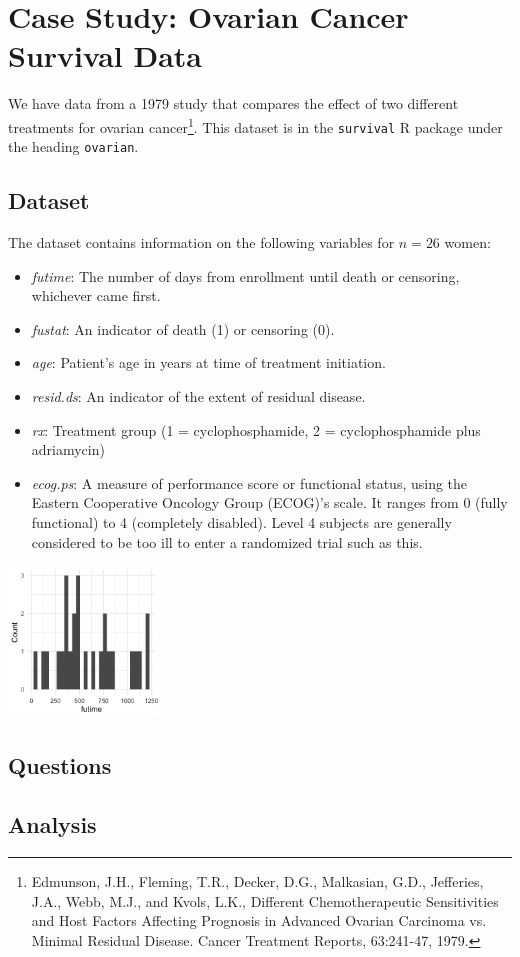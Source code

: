 \chapter{Case Study: Ovarian Cancer Survival Data}

We have data from a 1979 study that compares the effect of two different treatments for ovarian cancer\footnote{Edmunson, J.H., Fleming, T.R., Decker, D.G., Malkasian, G.D., Jefferies, J.A., Webb, M.J., and Kvols, L.K., Different Chemotherapeutic Sensitivities and Host Factors Affecting Prognosis in Advanced Ovarian Carcinoma vs. Minimal Residual Disease. Cancer Treatment Reports, 63:241-47, 1979.}. This dataset is in the \texttt{survival} R package under the heading \texttt{ovarian}. 

\section{Dataset}

The dataset contains information on the following variables for $n=26$ women:

\begin{itemize}
\item \emph{futime}: The number of days from enrollment until death or censoring, whichever came first.
\item \emph{fustat}: An indicator of death (1) or censoring (0).
\item \emph{age}: Patient's age in years at time of treatment initiation. 
\item \emph{resid.ds}: An indicator of the extent of residual disease.
\item \emph{rx}: Treatment group (1 = cyclophosphamide, 2 = cyclophosphamide plus adriamycin)
\item \emph{ecog.ps}: A measure of performance score or functional status, using the Eastern Cooperative Oncology Group (ECOG)'s scale. It ranges from 0 (fully functional) to 4 (completely disabled). Level 4 subjects are generally considered to be too ill to enter a randomized trial such as this.
\end{itemize}

\begin{center}
\includegraphics[width=0.3\textwidth]{img/cs-ovarian-futime.png}
\end{center}

\section{Questions}

\section{Analysis}



